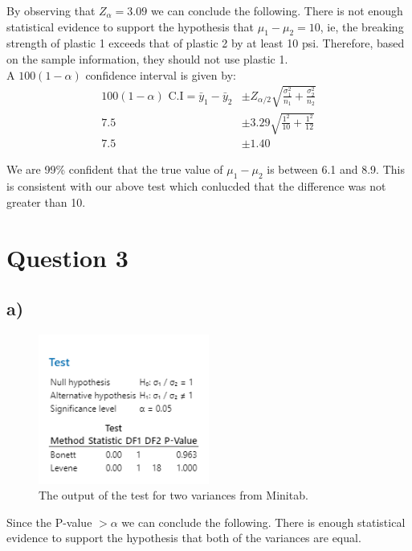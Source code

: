 \documentclass{article}
\begin{document}
By observing that $Z_{\alpha} = 3.09$ we can conclude the following.
There is not enough statistical evidence to support the hypothesis that $\mu_1 - \mu_2 = 10$,
ie, the breaking strength of plastic 1 exceeds that of plastic 2 by at least 10 psi.
Therefore, based on the sample information, they should not use plastic 1. \\

A $100(1-\alpha)$ confidence interval is given by:
\begin{align*}
  100(1-\alpha) \text{ C.I} = \bar{y}_1 - \bar{y}_2&\pm Z_{\alpha/2} \sqrt{\frac{\sigma_1^2}{n_1} + \frac{\sigma_2^2}{n_2}} \\
  7.5                       &\pm 3.29 \sqrt{\frac{1^2}{10} + \frac{1^2}{12}} \\
  7.5                       &\pm 1.40
\end{align*}

We are 99\% confident that the true value of $\mu_1 - \mu_2$ is between 6.1 and 8.9.
This is consistent with our above test which conlucded that the difference was not greater than 10.
\clearpage
\section*{Question 3}

\subsection*{a)}
\begin{figure}[h]
    \centering
    \includegraphics[width=0.5\textwidth]{./images/3_a.png}
    \caption{The output of the test for two variances from Minitab.}
    \label{fig:3_a}
  \end{figure}
  Since the P-value $> \alpha$ we can conclude the following.
  There is enough statistical evidence to support the hypothesis that both of the variances are equal.
\end{document}
